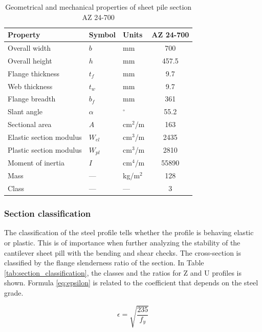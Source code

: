 \begin{table}[H]
  \centering
  \small
  \setlength{\tabcolsep}{6pt}
  \renewcommand{\arraystretch}{1.15}
  \caption{Geometrical and mechanical properties of sheet pile section AZ 24-700}
  \label{tab:pu32}
  \begin{tabular}{@{}l l l c@{}}
    \toprule
    Property & Symbol & Units & AZ 24-700 \\
    \midrule
    Overall width                & $b$     & mm     & 700   \\
    Overall height               & $h$     & mm     & 457.5   \\
    Flange thickness             & $t_f$   & mm     & 9.7  \\
    Web thickness                & $t_w$   & mm     & 9.7  \\
    Flange breadth               & $b_f$   & mm     & 361   \\
    Slant angle                  & $\alpha$ & $^\circ$ & 55.2 \\
    Sectional area               & $A$     & cm$^2$/m & 163 \\
    Elastic section modulus      & $W_{el}$ & cm$^3$/m & 2435 \\
    Plastic section modulus      & $W_{pl}$ & cm$^3$/m & 2810 \\
    Moment of inertia            & $I$     & cm$^4$/m & 55890 \\
    Mass                         & ---     & kg/m$^2$ & 128 \\
    Class    & ---     & ---     & 3 \\
    \bottomrule
  \end{tabular}
\end{table}

\subsubsection{Section classification}

The classification of the steel profile tells whether the profile is behaving elastic or plastic. This is of importance when further analyzing the stability of the cantilever sheet pill with the bending and shear checks. The cross-section is classified by the flange slenderness ratio of the section. In Table \ref{tab:section_classification}, the classes and the ratios for Z and U profiles is shown. Formula \ref{eq:epsilon} is related to the coefficient that depends on the steel grade. 

\begin{equation}
    \epsilon = \sqrt{\frac{235}{f_{y}}}
    \label{eq:epsilon}
\end{equation}

